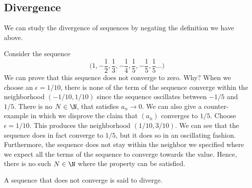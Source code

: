 \subsection{Divergence}

We can study the divergence of sequences by negating the definition we have above. 
\begin{ex}
Consider the sequence 
\[ \Big(1, -\frac{1}{2}, \frac{1}{3}, -\frac{1}{4}, \frac{1}{5}, -\frac{1}{5}, \frac{1}{5}...  \Big)\]
We can prove that this sequence does not converge to zero. Why? When we choose an \( \epsilon  = 1/10 \), there is none of the term of the sequence converge within the neighborhood \( (-1/10, 1/10 )\) since the sequence oscillates between \(-1 / 5 \)  and \( 1 / 5\). There is no \( N \in \N \), that satisfies \( a_n \to 0 \). We can also give a counter-example in which we disprove the claim that \( (a_n) \) converges to \( 1 / 5 \). Choose \( \epsilon = 1 / 10 \). This produces the neighborhood \( (1/10, 3/10 ) \). We can see that the sequence does in fact converge to \( 1 / 5 \), but it does so in an oscillating fashion. Furthermore, the sequence does not stay within the neighbor we specified where we expect all the terms of the sequence to converge towards the value. Hence, there is no such \( N \in \N \) where the property can be satisfied.  
\end{ex}


\begin{tcolorbox} 
\begin{defn}
A sequence that does not converge is said to diverge.
\end{defn}
\end{tcolorbox}


